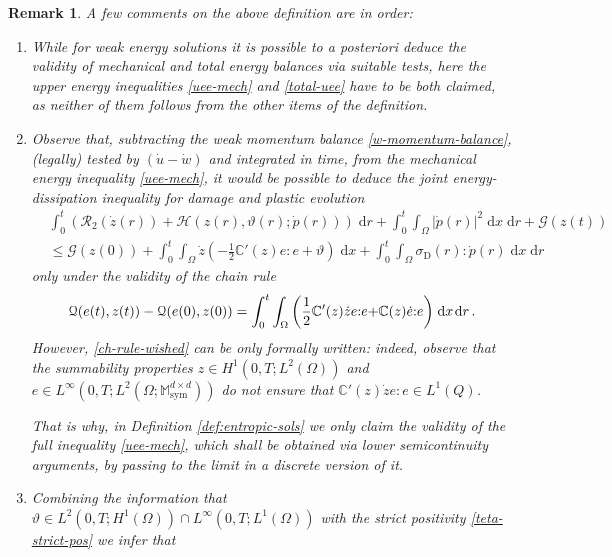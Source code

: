 \documentclass[a4paper,10pt,reqno]{amsart}
\numberwithin{equation}{section}
\newcommand{\bbM}{\mathbb{M}}
\numberwithin{equation}{section}
\newtheorem{remark}[theorem]{Remark}
\def\calG{{\mathcal G}} \def\calH{{\mathcal H}} \def\calI{{\mathcal I}}
\def\dd{\;\!\mathrm{d}} %
\newcommand{\teta}{\vartheta}
\newcommand{\bbC}{\mathbb{C}}
\newcommand{\mt}{\bbM}
\newcommand{\sym}{\mathrm{sym}}
\newcommand{\dev}{\mathrm{D}}
\newcommand{\Dip}[3]{\mathcal{H}(#1,#2;#3)}
\newcommand{\Didv}[1]{\mathcal{R}_{2}(#1)}
\newcommand{\ass}{a_{\mathrm{s}}}
\begin{document}
\begin{remark}
\label{rmk:clarification}
\upshape
A few comments on the above definition are in order:
\begin{enumerate}
\item While for weak energy solutions  it is possible to a posteriori deduce the validity of  mechanical and total energy \emph{balances} via suitable tests, 
here the upper energy inequalities \eqref{uee-mech} and \eqref{total-uee} have to be both claimed, as neither of them follows from the other items of the definition. 
\item
Observe that, subtracting the weak momentum balance \eqref{w-momentum-balance},  (legally) tested by $(\dot{u}{-}\dot{w})$  and integrated in time,
from the mechanical energy inequality \eqref{uee-mech}, it would be possible to deduce 
the \emph{joint energy-dissipation inequality for damage and plastic} evolution 
  \begin{equation}
  \label{joint-damage-plastic-endiss}
  \begin{aligned}
  &
   \int_0^t  \left( \Didv{\dot{z}(r)} {+}   \Dip{z(r)}{\teta(r)}{\dot{p}(r)}  \right) \dd r   +   \int_0^t\int_\Omega   |\dot{p}(r)|^2  \dd x \dd r 
   + \calG(z(t)) 
   \\
   &
   \leq  \calG(z(0)) 
  +  \int_0^t \int_\Omega \dot z \left({-}
  \tfrac12 \bbC'(z) e{:} e {+}\teta \right) \dd x
 + \int_0^t\int_\Omega \sigma_\dev(r) : \dot{p}(r) \dd x \dd r 
 \end{aligned}
 \end{equation}
only under the validity of  the chain rule
\begin{equation}
\label{ch-rule-wished}
\calQ(e(t),z(t)) - \calQ(e(0),z(0))  = \int_0^t \int_\Omega \left( \frac12 \bbC'(z) \dot{z} e{:} e {+} \bbC(z) \dot{e}{:} e \right) \dd x \dd r\,.
\end{equation}
However, \eqref{ch-rule-wished} can be only formally written: indeed, observe that the summability properties
$z\in H^1(0,T;L^2(\Omega))$ and $e \in L^\infty(0,T;L^2(\Omega;\mt_\sym^{d\times d}))$ do not ensure that  $\bbC'(z) \dot{z} e{:} e \in L^1(Q)$. 
\par
That is why,  in Definition \ref{def:entropic-sols} we  only claim the validity of the \emph{full} inequality \eqref{uee-mech}, which shall be obtained via lower semicontinuity arguments, by  passing to the limit in a discrete version of it.
\item Combining the information that $\teta \in L^2(0,T;H^1(\Omega)) \cap L^\infty (0,T;L^1(\Omega))$ with the strict positivity \eqref{teta-strict-pos} we infer that 

\end{enumerate}
\end{remark}
\end{document}
